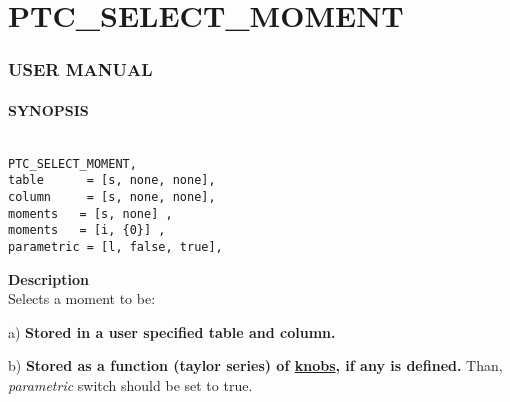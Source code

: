 


\section{PTC\_SELECT\_MOMENT}





\subsubsection{   USER MANUAL   }


\paragraph{SYNOPSIS}
\begin{verbatim}

PTC_SELECT_MOMENT, 
table      = [s, none, none], 
column     = [s, none, none], 
moments   = [s, none] , 
moments   = [i, {0}] , 
parametric = [l, false, true], 

\end{verbatim}


\textbf{ Description }\\

 Selects a moment to be: 

    a) \textbf{Stored in a user specified table and column. }

    b) \textbf{Stored as a function (taylor series) of        \href{PTC_Knob.html}{knobs},  if any is defined.}        Than, \textit{parametric} switch should be set to true.  

